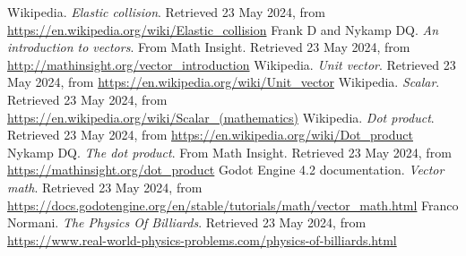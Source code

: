 \documentclass{amsart}
\begin{document}
\begin{thebibliography}{9}
  Wikipedia. \textit{Elastic collision}. Retrieved 23 May 2024, from
  \url{https://en.wikipedia.org/wiki/Elastic_collision}
  Frank D and Nykamp DQ. \textit{An introduction to vectors}. From Math Insight. Retrieved 23 May 2024, from
  \url{http://mathinsight.org/vector_introduction}
  Wikipedia. \textit{Unit vector}. Retrieved 23 May 2024, from
  \url{https://en.wikipedia.org/wiki/Unit_vector}
  Wikipedia. \textit{Scalar}. Retrieved 23 May 2024, from
  \url{https://en.wikipedia.org/wiki/Scalar_(mathematics)}
  Wikipedia. \textit{Dot product}. Retrieved 23 May 2024, from
  \url{https://en.wikipedia.org/wiki/Dot_product}
  Nykamp DQ. \textit{The dot product}. From Math Insight. Retrieved 23 May 2024, from
  \url{https://mathinsight.org/dot_product}
  Godot Engine 4.2 documentation. \textit{Vector math}. Retrieved 23 May 2024, from
  \url{https://docs.godotengine.org/en/stable/tutorials/math/vector_math.html}
  Franco Normani. \textit{The Physics Of Billiards}. Retrieved 23 May 2024, from
  \url{https://www.real-world-physics-problems.com/physics-of-billiards.html}
\end{thebibliography}
\end{document}
